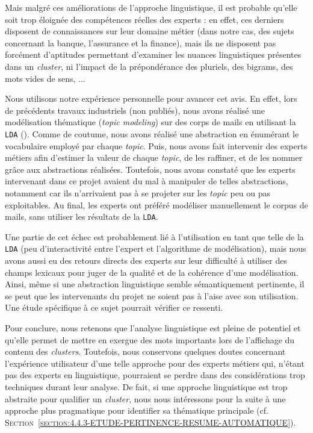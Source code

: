 			Mais malgré ces améliorations de l'approche linguistique, il est probable qu'elle soit trop éloignée des compétences réelles des experts : en effet, ces derniers disposent de connaissances sur leur domaine métier (dans notre cas, des sujets concernant la banque, l'assurance et la finance), mais ils ne disposent pas forcément d'aptitudes permettant d'examiner les nuances linguistiques présentes dans un \textit{cluster}, ni l'impact de la prépondérance des pluriels, des bigrams, des mots vides de sens, ...
		
			\begin{leftBarAuthorOpinion}
				Nous utilisons notre expérience personnelle pour avancer cet avis.
				En effet, lors de précédents travaux industriels (non publiés), nous avons réalisé une modélisation thématique (\textit{topic modeling}) sur des corps de mails en utilisant la \texttt{LDA} (\cite{blei-etal:2003:latent-dirichlet-allocation}).
				Comme de coutume, nous avons réalisé une abstraction en énumérant le vocabulaire employé par chaque \textit{topic}.
				Puis, nous avons fait intervenir des experts métiers afin d'estimer la valeur de chaque \textit{topic}, de les raffiner, et de les nommer grâce aux abstractions réalisées.
				Toutefois, nous avons constaté que les experts intervenant dans ce projet avaient du mal à manipuler de telles abstractions, notamment car ils n'arrivaient pas à se projeter sur les \textit{topic} peu ou pas exploitables.
				Au final, les experts ont préféré modéliser manuellement le corpus de mails, sans utiliser les résultats de la \texttt{LDA}.
				
				Une partie de cet échec est probablement lié à l'utilisation en tant que telle de la \texttt{LDA} (peu d'interactivité entre l'expert et l'algorithme de modélisation), mais nous avons aussi eu des retours directs des experts sur leur difficulté à utiliser des champs lexicaux pour juger de la qualité et de la cohérence d'une modélisation.
				Ainsi, même si une abstraction linguistique semble sémantiquement pertinente, il se peut que les intervenants du projet ne soient pas à l'aise avec son utilisation.
				Une étude spécifique à ce sujet pourrait vérifier ce ressenti.
			\end{leftBarAuthorOpinion}
			
			Pour conclure, nous retenons que l'analyse linguistique est pleine de potentiel et qu'elle permet de mettre en exergue des mots importants lors de l'affichage du contenu des \textit{clusters}.
			Toutefois, nous conservons quelques doutes concernant l'expérience utilisateur d'une telle approche pour des experts métiers qui, n'étant pas des experts en linguistique, pourraient se perdre dans des considérations trop techniques durant leur analyse.
			De fait, si une approche linguistique est trop abstraite pour qualifier un \textit{cluster}, nous nous intéressons pour la suite à une approche plus pragmatique pour identifier sa thématique principale (cf. \textsc{Section~\ref{section:4.4.3-ETUDE-PERTINENCE-RESUME-AUTOMATIQUE}}).
	
